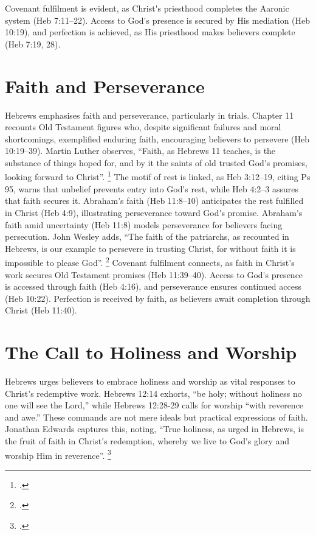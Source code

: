 \documentclass[12pt]{article}
\def\apos{^^27}         %
\def\christ{the Messiah}
\def\christ{Christ}
\begin{document}
Covenant fulfilment is evident, as \christ{}\apos{}s priesthood completes the
Aaronic system (Heb 7:11--22). Access to God\apos{}s presence is secured by His
mediation (Heb 10:19), and perfection is achieved, as His priesthood makes
believers complete (Heb 7:19, 28).

\section{Faith and Perseverance} Hebrews emphasises faith and perseverance,
particularly in trials.
%
Chapter 11 recounts Old Testament figures who, despite significant failures and
moral shortcomings, exemplified enduring faith, encouraging believers to
persevere (Heb 10:19--39).
%
Martin Luther observes, ``Faith, as Hebrews 11 teaches, is the substance of
things hoped for, and by it the saints of old trusted God\apos{}s promises,
looking forward to Christ''. \footcite[26]{Luther1968}
%
The motif of rest is linked, as Heb 3:12--19, citing Ps 95, warns that unbelief
prevents entry into God\apos{}s rest, while Heb 4:2--3 assures that faith
secures it.  Abraham\apos{}s faith (Heb 11:8--10) anticipates the rest fulfilled
in \christ{} (Heb 4:9), illustrating perseverance toward God\apos{}s promise.
%
Abraham\apos{}s faith amid uncertainty (Heb 11:8) models perseverance for
believers facing persecution.
%
John Wesley adds, ``The faith of the patriarchs, as recounted in Hebrews, is our
example to persevere in trusting Christ, for without faith it is impossible to
please God''. \footcite[Heb 11:6]{Wesley1755}
%
Covenant fulfilment connects, as faith in \christ{}\apos{}s work secures Old
Testament promises (Heb 11:39--40).
%
Access to God\apos{}s presence is accessed through faith (Heb 4:16), and
perseverance ensures continued access (Heb 10:22).
%
Perfection is received by faith, as believers await completion through \christ{}
(Heb 11:40).

\section{The Call to Holiness and Worship}
Hebrews urges believers to embrace holiness and worship as vital responses to
\christ{}\apos{}s redemptive work.
%
Hebrews 12:14 exhorts, ``be holy; without holiness no one will see the Lord,''
while Hebrews 12:28-29 calls for worship ``with reverence and awe.''
%
These commands are not mere ideals but practical expressions of faith.
%
Jonathan Edwards captures this, noting, ``True holiness, as urged in Hebrews, is
the fruit of faith in Christ\apos{}s redemption, whereby we live to God\apos{}s
glory and worship Him in reverence''. \footcite[2.3]{Edwards1959}
\end{document}
